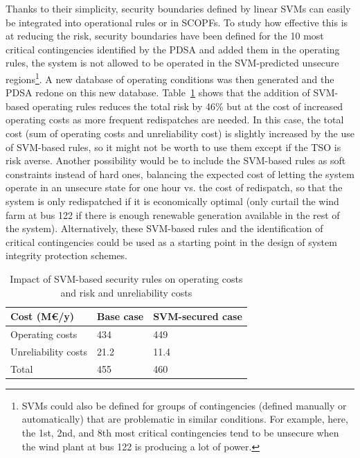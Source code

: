 Thanks to their simplicity, security boundaries defined by linear SVMs can easily be integrated into operational rules or in SCOPFs. To study how effective this is at reducing the risk, security boundaries have been defined for the 10 most critical contingencies identified by the PDSA and added them in the operating rules, \ie the system is not allowed to be operated in the SVM-predicted unsecure regions\footnote{SVMs could also be defined for groups of contingencies (defined manually or automatically) that are problematic in similar conditions. For example, here, the 1st, 2nd, and 8th most critical contingencies tend to be unsecure when the wind plant at bus 122 is producing a lot of power.}. A new database of operating conditions was then generated and the PDSA redone on this new database. Table~\ref{tab:enhancement} shows that the addition of SVM-based operating rules reduces the total risk by 46\% but at the cost of increased operating costs as more frequent redispatches are needed. In this case, the total cost (sum of operating costs and unreliability cost) is slightly increased by the use of SVM-based rules, so it might not be worth to use them except if the TSO is risk averse. Another possibility would be to include the SVM-based rules as soft constraints instead of hard ones, \ie balancing the expected cost of letting the system operate in an unsecure state for one hour vs. the cost of redispatch, so that the system is only redispatched if it is economically optimal (\eg only curtail the wind farm at bus 122 if there is enough renewable generation available in the rest of the system). Alternatively, these SVM-based rules and the identification of critical contingencies could be used as a starting point in the design of system integrity protection schemes.

\begin{table}
  \centering
  \caption{Impact of SVM-based security rules on operating costs and risk and unreliability costs}
  \label{tab:enhancement}
  \begin{tabular}{@{}lll@{}}
  \toprule
  Cost (M€/y)         & Base case & SVM-secured case \\ \midrule
  Operating costs     & 434       & 449 \\
  Unreliability costs & 21.2      & 11.4 \\
  Total               & 455       & 460  \\ \bottomrule
  \end{tabular}
\end{table}

